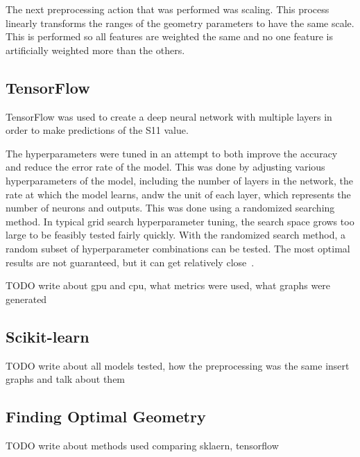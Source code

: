 \documentclass[lettersize,journal]{IEEEtran}
\begin{document}
The next preprocessing action that was performed was scaling. This process linearly transforms the ranges of the geometry parameters to have the same scale. This is performed so all features are weighted the same and no one feature is artificially weighted more than the others. 

\subsection{TensorFlow}
TensorFlow was used to create a deep neural network with multiple layers in order to make predictions of the S11 value.

The hyperparameters were tuned in an attempt to both improve the accuracy and reduce the error rate of the model. This was done by adjusting various hyperparameters of the model, including the number of layers in the network, the rate at which the model learns, andw the unit of each layer, which represents the number of neurons and outputs. This was done using a randomized searching method. In typical grid search hyperparameter tuning, the search space grows too large to be feasibly tested fairly quickly. With the randomized search method, a random subset of hyperparameter combinations can be tested. The most optimal results are not guaranteed, but it can get relatively close~\cite{omalley2019kerastuner}. 

TODO write about gpu and cpu, what metrics were used, what graphs were generated 

\subsection{Scikit-learn}


TODO write about all models tested, how the preprocessing was the same insert graphs and talk about them 

\subsection{Finding Optimal Geometry}
TODO write about methods used comparing sklaern, tensorflow
\end{document}
